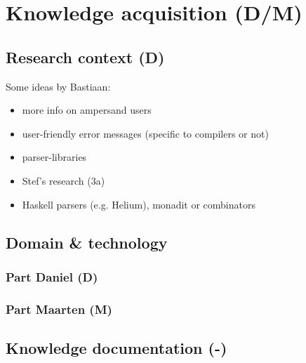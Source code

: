 
\section{Knowledge acquisition (D/M)}
\label{sec:knowledge-acquisition}

\subsection{Research context (D)}
Some ideas by Bastiaan:
\begin{itemize}
  \item more info on ampersand users
  \item user-friendly error messages (specific to compilers or not)
  \item parser-libraries
  \item Stef's research (3a)
  \item Haskell parsers (e.g. Helium), monadit or combinators
\end{itemize}

\subsection{Domain \& technology}
\subsubsection{Part Daniel (D)}
\lipsum[1]

\subsubsection{Part Maarten (M)}
\lipsum[1]

\subsection{Knowledge documentation (-)}
\lipsum[1]
